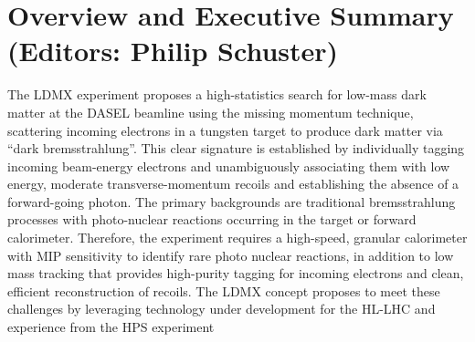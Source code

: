 \section{Overview and Executive Summary (Editors: Philip Schuster)}

The LDMX experiment proposes a high-statistics search for low-mass dark matter at the DASEL beamline using the missing momentum technique, scattering incoming electrons in a tungsten target to produce dark matter via ``dark bremsstrahlung''. This clear signature is established by individually tagging incoming beam-energy electrons and unambiguously associating them with low energy, moderate transverse-momentum recoils and establishing the absence of a forward-going photon. The primary backgrounds are traditional bremsstrahlung processes with photo-nuclear reactions occurring in the target or forward calorimeter. Therefore, the experiment requires a high-speed, granular calorimeter with MIP sensitivity to identify rare photo nuclear reactions, in addition to low mass tracking that provides high-purity tagging for incoming electrons and clean, efficient reconstruction of recoils. The LDMX concept proposes to meet these challenges by leveraging technology under development for the HL-LHC and experience from the HPS experiment